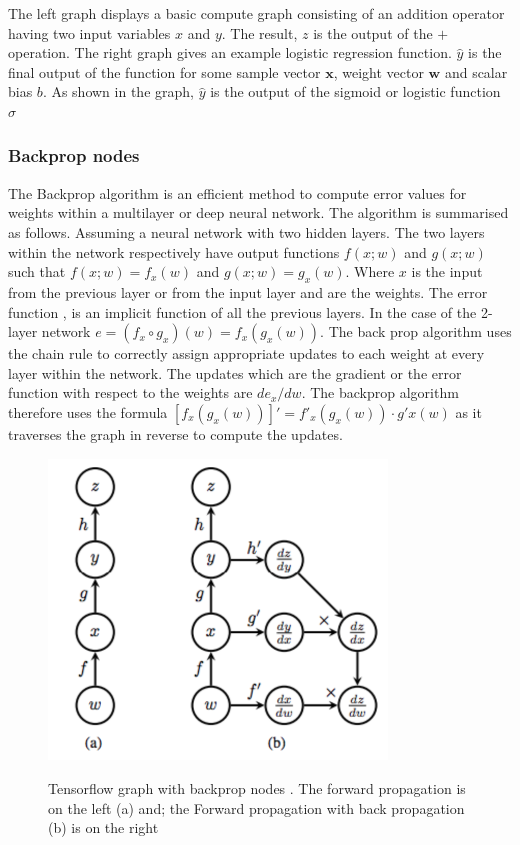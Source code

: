 The left graph displays a basic compute graph consisting of an addition operator having two input variables $x$ and $y$.  The result, $z$ is the output of the $+$ operation.  The right graph gives an example logistic regression function. $\hat{y}$ is the final output of the function for some sample vector $\mathbf{x}$, weight vector $\mathbf{w}$ and scalar bias $b$.  As shown in the graph, $\hat{y}$ is the output of the sigmoid or logistic function $\sigma$

\subsubsection{Backprop nodes}
The Backprop algorithm \cite{Goodfellow-et-al-2016} is an efficient method to compute error values for weights within a multilayer or deep neural network.  The algorithm is summarised as follows.  Assuming a neural network with two hidden layers. The two layers within the network respectively have output functions $f(x;w)$ and $g(x;w)$ such that $f(x;w)=f_x(w)$ and $g(x;w)=g_x(w)$.  Where $x$ is the input from the previous layer or from the input layer and  are the weights.  The error function , is an implicit function of all the previous layers.  In the case of the 2-layer network $e=(f_x \circ g_x)(w)=f_x(g_x(w))$.  The back prop algorithm uses the chain rule to correctly assign appropriate updates to each weight at every layer within the network.  The updates which are the gradient or the error function with respect to the weights are $de_x/dw$. The backprop algorithm therefore uses the formula $[f_x(g_x(w))]'=f'_x(g_x(w))\cdot g'x(w)$ as it traverses the graph in reverse to compute the updates. 
\begin{figure}
\centering
  \includegraphics[width=9cm]{thesis/images/bprop}\\
  \caption{Tensorflow graph with backprop nodes \citep{goldsborough2016tour}.  The forward propagation is on the left (a) and; the Forward propagation with back propagation (b) is on the right}\label{fig_c3_bprop}
\end{figure}

